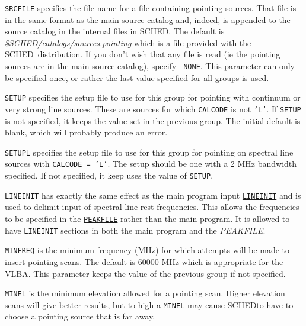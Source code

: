 \documentclass{report}
\newcommand{\sched}{{\sc SCHED}}
\newcommand{\schedb}{{\sc SCHED~}}
\begin{document}
\begin{list}{}{\parsep 0em  \itemsep 0em }

\item {\tt SRCFILE} specifies the file name for a file containing
pointing sources.  That file is in the same format as the
{\hyperref[SEC:SRCCAT]{main source catalog}} and, indeed, is appended to
the source catalog in the internal files in \sched.  The default is
{\sl \$SCHED/catalogs/sources.pointing} which is a file provided with
the \schedb distribution.  If you don't wish that any file is read (ie
the pointing sources are in the main source catalog), specify {\tt
NONE}.  This parameter can only be specified once, or rather the last
value specified for all groups is used.

\item {\tt SETUP} specifies the setup file to use for this group for
pointing with continuum or very strong line sources.  These are
sources for which {\tt CALCODE} is not {\tt 'L'}.  If {\tt SETUP} is
not specified, it keeps the value set in the previous group.  The
initial default is blank, which will probably produce an error.

\item {\tt SETUPL} specifies the setup file to use for this group for
pointing on spectral line sources with {\tt CALCODE = 'L'}.  The setup
should be one with a 2 MHz bandwidth specified.  If not specified, it
keep uses the value of {\tt SETUP}.

\item {\tt LINEINIT} has exactly the same effect as the main program
input 
{\hyperref[MP:LINEINIT]{{\tt LINEINIT}}} and is used to delimit
input of spectral line rest frequencies.  This allows the frequencies
to be specified in the 
{\hyperref[MP:PEAKFILE]{{\tt PEAKFILE}}} rather
than the main program.  It is allowed to have {\tt LINEINIT} sections
in both the main program and the {\sl PEAKFILE}.

\item {\tt MINFREQ} is the minimum frequency (MHz) for which attempts will
be made to insert pointing scans.  The default is 60000 MHz which is
appropriate for the VLBA.  This parameter keeps the value of the previous
group if not specified.

\item {\tt MINEL} is the minimum elevation allowed for a pointing scan.
Higher elevation scans will give better results, but to high a {\tt MINEL}
may cause \sched to have to choose a pointing source that is far away.


\end{list}
\end{document}
